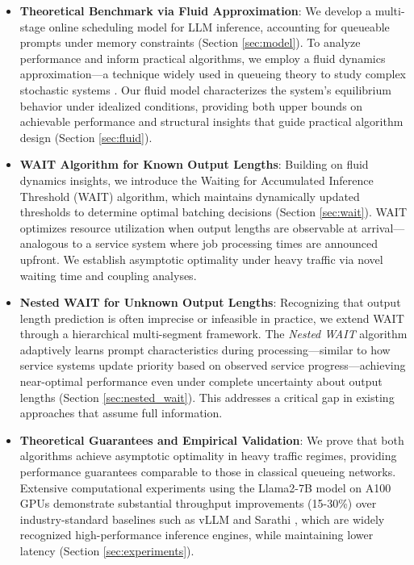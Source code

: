 \begin{itemize}
\item \textbf{Theoretical Benchmark via Fluid Approximation}: We develop a multi-stage online scheduling model for LLM inference, accounting for queueable prompts under memory constraints (Section \ref{sec:model}). To analyze performance and inform practical algorithms, we employ a fluid dynamics approximation---a technique widely used in queueing theory to study complex stochastic systems \citep{mandelbaum1998strong,maglaras2000discrete,bauerle2002optimal,liu2011network}. Our fluid model characterizes the system's equilibrium behavior under idealized conditions, providing both upper bounds on achievable performance and structural insights that guide practical algorithm design (Section \ref{sec:fluid}).

    \item \textbf{WAIT Algorithm for Known Output Lengths}: Building on fluid dynamics insights, we introduce the Waiting for Accumulated Inference Threshold (WAIT) algorithm, which maintains dynamically updated thresholds to determine optimal batching decisions (Section \ref{sec:wait}). WAIT optimizes resource utilization when output lengths are observable at arrival---analogous to a service system where job processing times are announced upfront. We establish asymptotic optimality under heavy traffic via novel waiting time and coupling analyses.

    \item \textbf{Nested WAIT for Unknown Output Lengths}: Recognizing that output length prediction is often imprecise or infeasible in practice, we extend WAIT through a hierarchical multi-segment framework. The \textit{Nested WAIT} algorithm adaptively learns prompt characteristics during processing---similar to how service systems update priority based on observed service progress---achieving near-optimal performance even under complete uncertainty about output lengths (Section \ref{sec:nested_wait}). This addresses a critical gap in existing approaches that assume full information.
    
    \item \textbf{Theoretical Guarantees and Empirical Validation}: We prove that both algorithms achieve asymptotic optimality in heavy traffic regimes, providing performance guarantees comparable to those in classical queueing networks. Extensive computational experiments using the Llama2-7B model on A100 GPUs demonstrate substantial throughput improvements (15-30\%) over industry-standard baselines such as vLLM \citep{kwon2023efficient} and Sarathi \citep{agrawal2023sarathi}, which are widely recognized high-performance inference engines, while maintaining lower latency (Section \ref{sec:experiments}).
\end{itemize}

